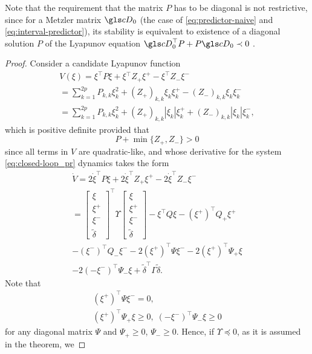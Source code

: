 Note that the requirement that the matrix $P$ has to be diagonal is not
restrictive, since for a Metzler matrix $\cD_{0}$ (the case of \eqref{eq:predictor-naive}
and \eqref{eq:interval-predictor}), its stability is equivalent to
existence of a diagonal solution $P$ of the Lyapunov equation $\cD_{0}^{\top}P+P\cD_{0}\prec0$
\citep{Positive}.
\begin{proof}
	Consider a candidate Lyapunov function
	\begin{gather*}
	V(\xi)=\xi^{\top}P\xi+\xi{}^{\top}Z_{+}\xi^{+}-\xi^{\top}Z_{-}\xi^{-}\\
	=\sum_{k=1}^{2p}P_{k,k}\xi_{k}^{2}+(Z_{+})_{k,k}\xi_{k}\xi_{k}^{+}-(Z_{-})_{k,k}\xi_{k}\xi_{k}^{-}\\
	=\sum_{k=1}^{2p}P_{k,k}\xi_{k}^{2}+(Z_{+})_{k,k}|\xi_{k}|\xi_{k}^{+}+(Z_{-})_{k,k}|\xi_{k}|\xi_{k}^{-},
	\end{gather*}
	which is positive definite provided that
	\[
	P+\min\{Z_{+},Z_{-}\}>0
	\]
	since all terms in $V$ are quadratic-like, and whose derivative for
	the system \eqref{eq:closed-loop_pr} dynamics takes the form
	\begin{gather*}
	\dot{V}=2\dot{\xi}^{\top}P\xi+2\dot{\xi}^{\top}Z_{+}\xi^{+}-2\dot{\xi}^{\top}Z_{-}\xi^{-}\\
	=\left[\begin{array}{c}
	\xi\\
	\xi^{+}\\
	\xi^{-}\\
	\tilde{\delta}
	\end{array}\right]^{\top}\Upsilon\left[\begin{array}{c}
	\xi\\
	\xi^{+}\\
	\xi^{-}\\
	\tilde{\delta}
	\end{array}\right]-\xi^{\top}Q\xi-(\xi^{+})^{\top}Q_{+}\xi^{+}\\
	-(\xi^{-})^{\top}Q_{-}\xi^{-}-2(\xi^{+})^{\top}\Psi\xi^{-}-2(\xi^{+})^{\top}\Psi_{+}\xi\\
	-2(-\xi^{-})^{\top}\Psi_{-}\xi+\tilde{\delta}^{\top}\Gamma\tilde{\delta}.
	\end{gather*}
	Note that
	\begin{gather*}
	(\xi^{+})^{\top}\Psi\xi^{-}=0,\\
	(\xi^{+})^{\top}\Psi_{+}\xi\geq0,\;(-\xi^{-})^{\top}\Psi_{-}\xi\geq0
	\end{gather*}
	for any diagonal matrix $\Psi$ and $\Psi_{+}\geq0$, $\Psi_{-}\geq0$.
	Hence, if $\Upsilon\preceq0$, as it is assumed in the theorem, we

\end{proof}
